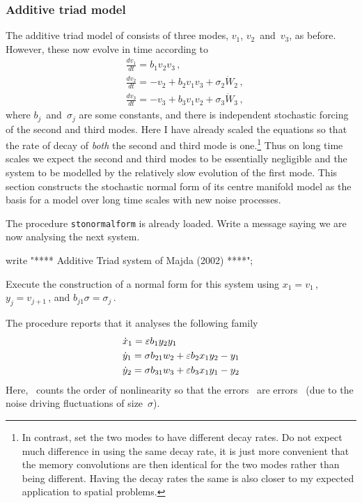 \subsubsection{Additive triad model}

The additive triad model of \cite{Majda02} consists of three modes, 
$v_1$, $v_2$~and~$v_3$, as before.
However, these now evolve in time according to
\begin{align*}&
	\frac{dv_1}{dt}=b_1v_2v_3\,,
	\\&
	\frac{dv_2}{dt}=-v_2+b_2v_1v_3+\sigma_2\dot W_2\,,
	\\&
	\frac{dv_3}{dt}=-v_3+b_3v_1v_2+\sigma_3\dot W_3\,,
\end{align*}
where $b_j$~and~$\sigma_j$ are some constants, and there is independent stochastic forcing of the second and third modes.
Here I have already scaled the equations so that the rate of decay of \emph{both} the second and third mode is one.\footnote{In contrast, \cite{Majda02} set the two modes to have different decay rates.
Do not expect much difference in using the same decay rate, it is just more convenient that the memory convolutions are then identical for the two modes rather than being different.
Having the decay rates the same is also closer to my expected application to spatial problems.} Thus on long time scales we expect the second and third modes to be essentially negligible and the system to be modelled by the relatively slow evolution of the first mode.
This section constructs the stochastic normal form of its centre manifold model as the basis for a model over long time scales with new noise processes.

The procedure \verb|stonormalform| is already loaded.
Write a message saying we are now analysing the next system.
\begin{reduce}
write "**** Additive Triad system of Majda (2002) ****";
\end{reduce}
Execute the construction of a normal form for this system using \(x_1=v_1\)\,, \(y_j=v_{j+1}\)\,, and \(b_{j1}\sigma=\sigma_j\)\,.

The procedure reports that it analyses the following family 
\begin{align*}&
\dot x_{1}=\varepsilon b_{1} y_{2} y_{1}
\\&
\dot y_{1}=\sigma  b_{21}w_{2} +\varepsilon b_{2} x_{1} y_{2}-y_{1}
\\&
\dot y_{2}=\sigma  b_{31}w_{3} +\varepsilon b_{3} x_{1} y_{1}-y_{2}
\end{align*}
Here, \eps\ counts the order of nonlinearity so that the errors~ are errors~ (due to the noise driving fluctuations of size~\(\sigma\)).



